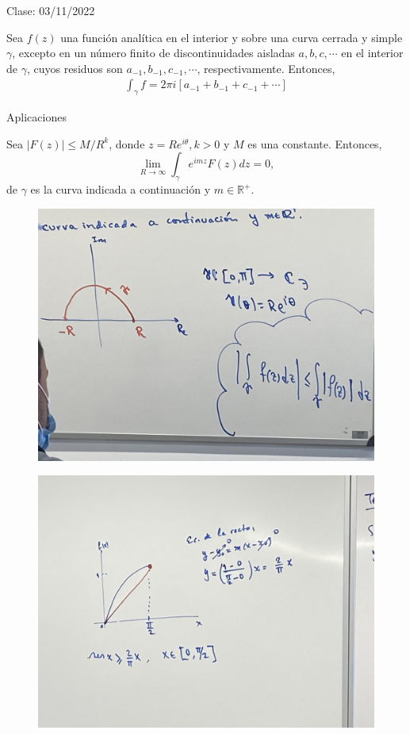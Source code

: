 Clase: 03/11/2022

\begin{teorema}[de Residuos]
    Sea $f(z)$ una función analítica en el interior y sobre una curva cerrada y simple $\gamma$, excepto en un número finito de discontinuidades aisladas $a,b,c,\cdots$ en el interior de $\gamma$, cuyos residuos son $a_{-1},b_{-1},c_{-1},\cdots$, respectivamente. Entonces, 
    \begin{align*}
        \int_\gamma f = 2\pi i\left[a_{-1}+b_{-1}+c_{-1}+\cdots\right]
    \end{align*}
\end{teorema}

Aplicaciones
\begin{lema}
    Sea $|F(z)|\leq M/R^k$, donde $z=Re^{i\theta},k>0$ y $M$ es una constante. Entonces, 
    $$\lim_{R\to \infty}\int_\gamma e^{imz}F(z)dz = 0,$$
    de $\gamma$ es la curva indicada a continuación y $m\in \mathbb{R}^+$.
    \begin{figure}[H]
        \centering
        \includegraphics[scale=0.15]{imagenes/25.1}
    \end{figure}
    \begin{figure}[H]
        \centering
        \includegraphics[scale=0.15]{imagenes/25.2}

\end{figure}
\end{lema}
